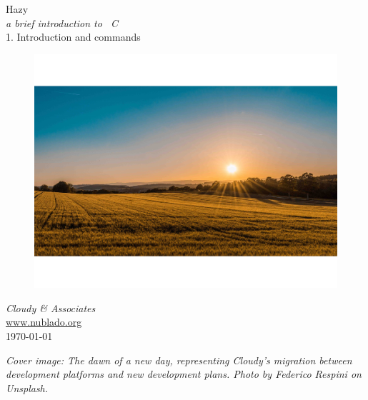 \documentclass[12pt]{book}
\begin{document}
\frontmatter

\begin{titlepage}
\begin{center}

\Huge
Hazy\\
\Large
\emph{a brief introduction to \Cloudy\ C\VERSION}\\
\LARGE
1. Introduction and commands

\begin{figure}
\begin{center}
\hspace*{-1cm}
\includegraphics[clip=on,width=\columnwidth,height=0.6\textheight,keepaspectratio]{federico-respini-sYffw0LNr7s-unsplash}
\end{center}
\end{figure}

\vspace{10 mm }
\LARGE
\emph{Cloudy \& Associates} \\
\Large
\href{http://www.nublado.org}{www.nublado.org} \\
\normalsize
\today
\end{center}
\end{titlepage}

\clearpage

\vspace{5mm}
\noindent
{\small
{\em Cover image:
The dawn of a new day, representing Cloudy's migration between
development platforms and new development plans. Photo by Federico Respini on Unsplash.
}
}
\clearpage
\end{document}
